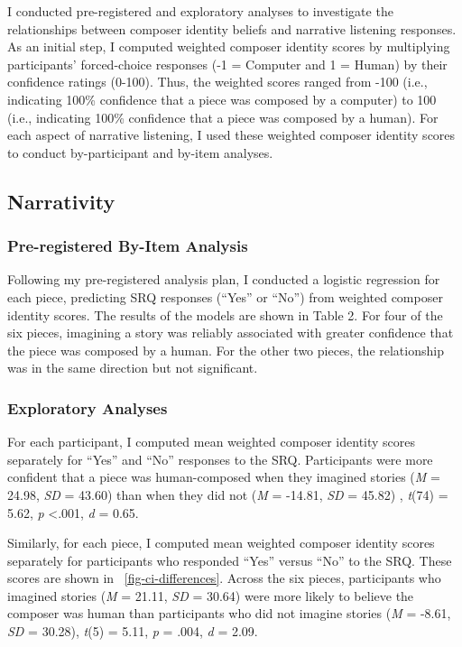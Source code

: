 \documentclass[12pt,twoside]{reedthesis}
\begin{document}
I conducted pre-registered and exploratory analyses to investigate the relationships between composer identity beliefs and narrative listening responses. As an initial step, I computed weighted composer identity scores by multiplying participants’ forced-choice responses (-1 = Computer and 1 = Human) by their confidence ratings (0-100). Thus, the weighted scores ranged from -100 (i.e., indicating 100\% confidence that a piece was composed by a computer) to 100 (i.e., indicating 100\% confidence that a piece was composed by a human). For each aspect of narrative listening, I used these weighted composer identity scores to conduct by-participant and by-item analyses. 

\subsection*{Narrativity}
\subsubsection*{Pre-registered By-Item Analysis}
Following my pre-registered analysis plan, I conducted a logistic regression for each piece, predicting SRQ responses (“Yes” or “No”) from weighted composer identity scores. The results of the models are shown in Table 2. For four of the six pieces, imagining a story was reliably associated with greater confidence that the piece was composed by a human. For the other two pieces, the relationship was in the same direction but not significant.

\subsubsection*{Exploratory Analyses}

For each participant, I computed mean weighted composer identity scores separately for “Yes” and “No” responses to the SRQ. Participants were more confident that a piece was human-composed when they imagined stories (\emph{M} = 24.98, \emph{SD} = 43.60) than when they did not (\emph{M} = -14.81, \emph{SD} = 45.82) , \emph{t}(74) = 5.62, \emph{p} \textless .001, \emph{d} = 0.65. 

Similarly, for each piece, I computed mean weighted composer identity scores separately for participants who responded “Yes” versus “No” to the SRQ. These scores are shown in ~\ref{fig-ci-differences}. Across the six pieces, participants who imagined stories (\emph{M} = 21.11, \emph{SD} = 30.64) were more likely to believe the composer was human than participants who did not imagine stories (\emph{M} = -8.61, \emph{SD} = 30.28), \emph{t}(5) = 5.11, \emph{p} = .004, \emph{d} = 2.09.
\end{document}
